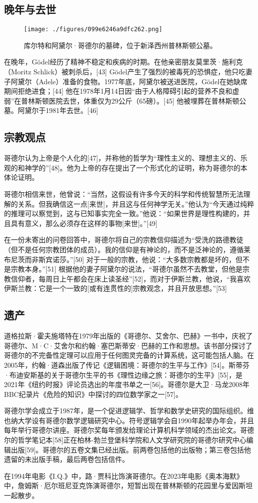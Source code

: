 \subsection{晚年与去世}
\begin{figure}[ht]
\centering
\texttt{[image: ./figures/099e6246a9dfc262.png]}
\caption{库尔特和阿黛尔·哥德尔的墓碑，位于新泽西州普林斯顿公墓。} \label{fig_KRT_4}
\end{figure}
在晚年，Gödel经历了精神不稳定和疾病的时期。在他亲密朋友莫里茨·施利克（Moritz Schlick）被刺杀后，[43] Gödel产生了强烈的被毒死的恐惧症，他只吃妻子阿黛尔（Adele）准备的食物。1977年底，阿黛尔被送进医院，Gödel在她缺席期间拒绝进食；[44] 他在1978年1月14日因“由于人格障碍引起的营养不良和虚弱”在普林斯顿医院去世，体重仅为29公斤（65磅）。[45] 他被埋葬在普林斯顿公墓。阿黛尔于1981年去世。[46]
\subsection{宗教观点}  
哥德尔认为上帝是个人化的[47]，并称他的哲学为“理性主义的、理想主义的、乐观的和神学的”[48]。他为上帝的存在提出了一个形式化的证明，称为哥德尔的本体论证明。

哥德尔相信来世，他曾说：“当然，这假设有许多今天的科学和传统智慧所无法理解的关系。但我确信这一点[来世]，并且这与任何神学无关。”他认为“今天通过纯粹的推理可以察觉到，这与已知事实完全一致。”他说：“如果世界是理性构建的，并且具有意义，那么必须存在这样的事物[来世]。”[49]

在一份未寄出的问卷回答中，哥德尔将自己的宗教信仰描述为“受洗的路德教徒（但不是任何宗教团体的成员）。我的信仰是有神论的，而不是泛神论的，遵循莱布尼茨而非斯宾诺莎。”[50] 对于一般的宗教，他说：“大多数宗教都是坏的，但不是宗教本身。”[51] 根据他的妻子阿黛尔的说法，“哥德尔虽然不去教堂，但他是宗教信仰者，每周日上午都会在床上读圣经”[52]，而对于伊斯兰教，他说，“我喜欢伊斯兰教：它是一个一致的[或有连贯性的]宗教观念，并且开放思想。”[53]
\subsection{遗产}  
道格拉斯·霍夫施塔特在1979年出版的《哥德尔、艾舍尔、巴赫》一书中，庆祝了哥德尔、M·C·艾舍尔和约翰·塞巴斯蒂安·巴赫的工作和思想。该书部分探讨了哥德尔的不完备性定理可以应用于任何图灵完备的计算系统，这可能包括人脑。在2005年，约翰·道森出版了传记《逻辑困境：哥德尔的生平与工作》[54]。斯蒂芬·布迪安斯基的关于哥德尔生平的书《理性边缘之旅：哥德尔的生平》[55]，是2021年《纽约时报》评论员选出的年度书单之一[56]。哥德尔是大卫·马龙2008年BBC纪录片《危险的知识》中探讨的四位数学家之一[57]。

哥德尔学会成立于1987年，是一个促进逻辑学、哲学和数学史研究的国际组织。维也纳大学设有哥德尔数学逻辑研究中心。符号逻辑学会自1990年起举办年会，并且每年举行哥德尔讲座。哥德尔奖每年颁发给理论计算机科学领域的杰出论文。哥德尔的哲学笔记本[58]正在柏林-勃兰登堡科学院和人文学研究院的哥德尔研究中心编辑出版[59]。哥德尔的五卷文集已经出版。前两卷包括他的出版物；第三卷包括他遗留的未出版手稿，最后两卷包括信件。

在1994年电影《I.Q.》中，路·贾科比饰演哥德尔。在2023年电影《奥本海默》中，詹姆斯·厄尔班尼亚克饰演哥德尔，短暂出现在普林斯顿的花园里与爱因斯坦一起散步。